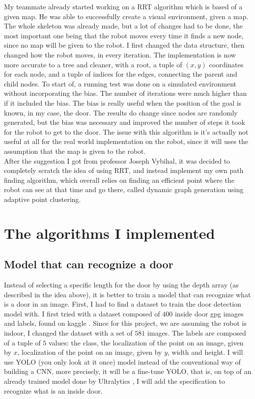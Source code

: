 \documentclass{article}
\begin{document}
My teammate already started working on a RRT algorithm which is based of a given map. He was able to successfully create a visual environment, given a map. The whole skeleton was already made, but a lot of changes had to be done, the most important one being that the robot moves every time it finds a new node, since no map will be given to the robot. I first changed the data structure, then changed how the robot moves, in every iteration. The implementation is now more accurate to a tree and cleaner, with a root, a tuple of $(x, y)$ coordinates for each node, and a tuple of indices for the edges, connecting the parent and child nodes. To start of, a running test was done on a simulated environment without incorporating the bias. The number of iterations were much higher than if it included the bias. The bias is really useful when the position of the goal is known, in my case, the door. The results do change since nodes are randomly generated, but the bias was necessary and improved the number of steps it took for the robot to get to the door. The issue with this algorithm is it's actually not useful at all for the real world implementation on the robot, since it will uses the assumption that the map is given to the robot.\\

After the suggestion I got from professor Joseph Vybihal, it was decided to completely scratch the idea of using RRT, and instead implement my own path finding algorithm, which overall relies on finding an efficient point where the robot can see at that time and go there, called dynamic graph generation using adaptive point clustering. 

\section{The algorithms I implemented}

\subsection{Model that can recognize a door}
Instead of selecting a specific length for the door by using the depth array (as described in the idea above), it is better to train a model that can recognize what is a door in an image. First, I had to find a dataset to train the door detection model with. I first tried with a dataset composed of $400$ inside door gpg images and labels, found on kaggle \cite{sayedmohamed_2023}. Since for this project, we are assuming the robot is indoor, I changed the dataset with a set of $581$ images. The labels are composed of a tuple of $5$ values: the class, the localization of the point on an image, given by $x$, localization of the point on an image, given by $y$, width and height. I will use YOLO (you only look at it once) model instead of the conventional way of building a CNN, more precisely, it will be a fine-tune YOLO, that is, on top of an already trained model done by Ultralytics \cite{Jocher_Ultralytics_YOLO_2023}, I will add the specification to recognize what is an inside door. \\
\end{document}
